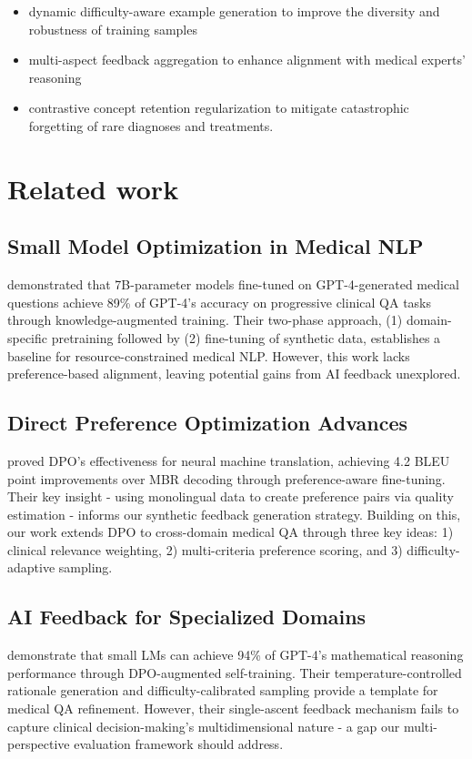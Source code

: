 \documentclass[11pt,a4paper]{article}
\begin{document}
\begin{itemize}
    \item dynamic difficulty-aware example generation to improve the diversity and robustness of training samples
    \item multi-aspect feedback aggregation to enhance alignment with medical experts' reasoning
    \item contrastive concept retention regularization to mitigate catastrophic forgetting of rare diagnoses and treatments.
\end{itemize} 


\section{Related work}

\subsection{Small Model Optimization in Medical NLP}  
\citet{khlaut-etal-2024-efficient} demonstrated that 7B-parameter models fine-tuned on GPT-4-generated medical questions achieve 89\% of GPT-4's accuracy on progressive clinical QA tasks through knowledge-augmented training. Their two-phase approach, (1) domain-specific pretraining followed by (2) fine-tuning of synthetic data, establishes a baseline for resource-constrained medical NLP. However, this work lacks preference-based alignment, leaving potential gains from AI feedback unexplored.


\subsection{Direct Preference Optimization Advances}
\citet{yang-etal-2024-direct} proved DPO's effectiveness for neural machine translation, achieving 4.2 BLEU point improvements over MBR decoding through preference-aware fine-tuning. Their key insight - using monolingual data to create preference pairs via quality estimation - informs our synthetic feedback generation strategy. Building on this, our work extends DPO to cross-domain medical QA through three key ideas: 1) clinical relevance weighting, 2) multi-criteria preference scoring, and 3) difficulty-adaptive sampling.

\subsection{AI Feedback for Specialized Domains}
\citet{chen-etal-2024-exploring-potential} demonstrate that small LMs can achieve 94\% of GPT-4's mathematical reasoning performance through DPO-augmented self-training. Their temperature-controlled rationale generation and difficulty-calibrated sampling provide a template for medical QA refinement. However, their single-ascent feedback mechanism fails to capture clinical decision-making's multidimensional nature - a gap our multi-perspective evaluation framework should address.
\end{document}
